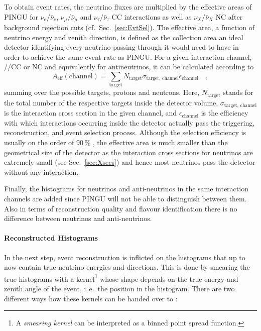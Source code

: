 To obtain event rates, the neutrino fluxes are multiplied by the effective
areas of PINGU for $\nu_e/\bar\nu_e$, $\nu_\mu/\bar\nu_\mu$ and
$\nu_\tau/\bar\nu_\tau$ CC interactions as well as $\nu_X/\bar\nu_X$ NC after
background rejection cuts (cf.\ Sec.~\ref{sec:EvtSel}). The effective area, a
function of neutrino energy and zenith direction, is defined as the collection
area an ideal detector identifying every neutrino passing through it would need
to have in order to achieve the same event rate as PINGU. For a given
interaction channel, \nue/\numu/\nutau CC or \nux NC and equivalently for
antineutrinos, it can be calculated according to
\begin{equation}
 A_\mathrm{eff}(\mathrm{channel}) = \sum_\mathrm{target} N_\mathrm{target}
   \sigma_{\mathrm{target},\,\mathrm{channel}} \epsilon_\mathrm{channel} \quad,
\end{equation}
summing over the possible targets, protons and neutrons. Here,
$N_\mathrm{target}$ stands for the total number of the respective targets
inside the detector volume, $\sigma_{\mathrm{target},\,\mathrm{channel}}$ is
the interaction cross section in the given channel, and
$\epsilon_\mathrm{channel}$ is the efficiency with which interactions occurring
inside the detector actually pass the triggering, reconstruction, and event
selection process. Although the selection efficiency is usually on the order of
90\,\% \cite{cutsV5}, the effective area is much smaller than the geometrical
size of the detector as the interaction cross sections for neutrinos are
extremely small (see Sec.~\ref{sec:Xsecs}) and hence most neutrinos pass the
detector without any interaction.

Finally, the histograms for neutrinos and anti-neutrinos in the same
interaction channels are added since PINGU will not be able to distinguish
between them. Also in terms of reconstruction quality and flavour
identification there is no difference between neutrinos and anti-neutrinos.



\paragraph{Reconstructed Histograms}

In the next step, event reconstruction is inflicted on the histograms that up
to now contain true neutrino energies and directions. This is done by smearing
the true histograms with a kernel\footnote{A \emph{smearing kernel} can be
interpreted as a binned point spread function.} whose shape depends on the true
energy and zenith angle of the event, i.\,e.\ the position in the histogram.
There are two different ways how these kernels can be handed over to \papa:

